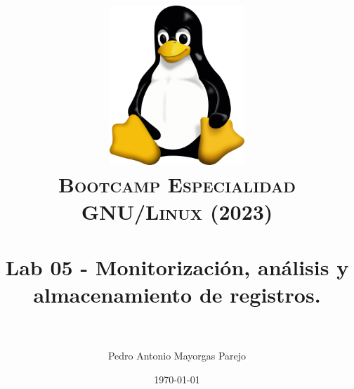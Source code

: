 

\graphicspath{ {img/} }

\title{
\normalfont \normalsize
\includegraphics[width=6cm,height=6cm]{logo}\\
\textsc{\textbf{Bootcamp Especialidad GNU/Linux (2023)}} \\ [25pt] %
\horrule{0.5pt} \\[0.4cm] %
\huge Lab 05 - Monitorización, análisis y almacenamiento de registros. \\ %
\horrule{2pt} \\[0.5cm] %
}



\author{Pedro Antonio Mayorgas Parejo} %

\date{\normalsize\today} %




\maketitle %

\newpage %

\tableofcontents %

\newpage

